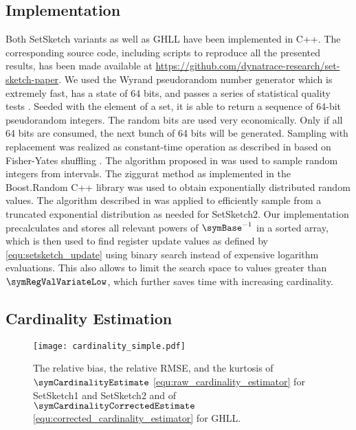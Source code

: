 \documentclass[sigconf, nonacm]{acmart}
\begin{document}
\subsection{Implementation}
Both SetSketch variants as well as \ac{GHLL} have been implemented in C++. The corresponding source code, including scripts to reproduce all the presented results, has been made available at \url{https://github.com/dynatrace-research/set-sketch-paper}. We used the Wyrand pseudorandom number generator \cite{Yi2021} which is extremely fast, has a state of 64 bits, and passes a series of statistical quality tests \cite{Lemire2019a}. Seeded with the element of a set, it is able to return a sequence of 64-bit pseudorandom integers. The random bits are used very economically. Only if all 64 bits are consumed, the next bunch of 64 bits will be generated. Sampling with replacement was realized as constant-time operation as described in \cite{Ertl2020} based on Fisher-Yates shuffling \cite{Fisher1938}. The algorithm proposed in \cite{Lemire2019} was used to sample random integers from intervals. The ziggurat method \cite{Marsaglia2000} as implemented in the Boost.Random C++ library \cite{Watanabe2020} was used to obtain exponentially distributed random values. The algorithm described in \cite{Ertl2020} was applied to efficiently sample from a truncated exponential distribution as needed for SetSketch2. 
Our implementation precalculates and stores all relevant powers of $\symBase^{-1}$ in a sorted array, which is then used to find register update values as defined by \eqref{equ:setsketch_update} using binary search instead of expensive logarithm evaluations. This also allows to limit the search space to values greater than $\symRegValVariateLow$, which further saves time with increasing cardinality.

\subsection{Cardinality Estimation}
\label{sec:card_experiment}

\begin{figure}
\centering
\texttt{[image: cardinality\_simple.pdf]}
\caption{\boldmath The relative bias, the relative \acs*{RMSE}, and the kurtosis of $\symCardinalityEstimate$ \eqref{equ:raw_cardinality_estimator} for SetSketch1 and SetSketch2 and of $\symCardinalityCorrectedEstimate$ \eqref{equ:corrected_cardinality_estimator} for \acs*{GHLL}.}
\label{fig:cardinality}
\end{figure}
\end{document}
